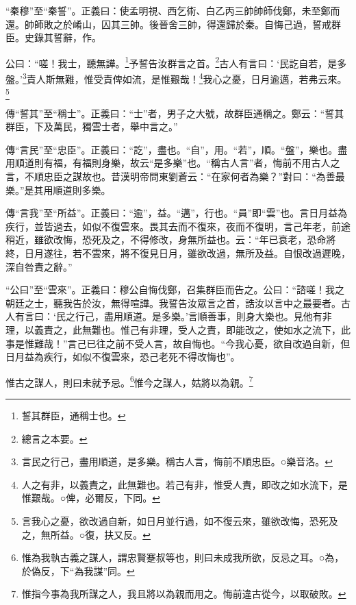 {\noindent\shu{}\fzkt “秦穆”至“秦誓”。正義曰：使孟明視、西乞術、白乙丙三帥帥師伐鄭，未至鄭而還。帥師敗之於崤山，囚其三帥。後晉舍三帥，得還歸於秦。自悔己過，誓戒群臣。史錄其誓辭，作。 \par}

公曰：“嗟！我士，聽無譁。\footnote{誓其群臣，通稱士也。}予誓告汝群言之首。\footnote{總言之本要。}古人有言曰：‘民訖自若，是多盤。’\footnote{言民之行己，盡用順道，是多樂。稱古人言，悔前不順忠臣。○樂音洛。}責人斯無難，惟受責俾如流，是惟艱哉！\footnote{人之有非，以義責之，此無難也。若己有非，惟受人責，即改之如水流下，是惟艱哉。○俾，必爾反，下同。}我心之憂，日月逾邁，若弗云來。\footnote{言我心之憂，欲改過自新，如日月並行過，如不復云來，雖欲改悔，恐死及之，無所益。○復，扶又反。}


{\noindent\zhuan{}\fzbyks 傳“誓其”至“稱士”。正義曰：“士”者，男子之大號，故群臣通稱之。鄭云：“誓其群臣，下及萬民，獨雲士者，舉中言之。” \par}

{\noindent\zhuan{}\fzbyks 傳“言民”至“忠臣”。正義曰：“訖”，盡也。“自”，用。“若”，順。“盤”，樂也。盡用順道則有福，有福則身樂，故云“是多樂”也。“稱古人言”者，悔前不用古人之言，不順忠臣之謀故也。昔漢明帝問東劉蒼云：“在家何者為樂？”對曰：“為善最樂。”是其用順道則多樂。 \par}

{\noindent\zhuan{}\fzbyks 傳“言我”至“所益”。正義曰：“逾”，益。“邁”，行也。“員”即“雲”也。言日月益為疾行，並皆過去，如似不復雲來。畏其去而不復來，夜而不復明，言己年老，前途稍近，雖欲改悔，恐死及之，不得修改，身無所益也。云：“年已衰老，恐命將終，日月遂往，若不雲來，將不復見日月，雖欲改過，無所及益。自恨改過遲晚，深自咎責之辭。” \par}

{\noindent\shu{}\fzkt “公曰”至“雲來”。正義曰：穆公自悔伐鄭，召集群臣而告之。公曰：“諮嗟！我之朝廷之士，聽我告於汝，無得喧譁。我誓告汝眾言之首，誥汝以言中之最要者。古人有言曰：‘民之行己，盡用順道。是多樂。’言順善事，則身大樂也。見他有非理，以義責之，此無難也。惟己有非理，受人之責，即能改之，使如水之流下，此事是惟難哉！”言己已往之前不受人言，故自悔也。“今我心憂，欲自改過自新，但日月益為疾行，如似不復雲來，恐己老死不得改悔也”。 \par}

惟古之謀人，則曰未就予忌。\footnote{惟為我執古義之謀人，謂忠賢蹇叔等也，則曰未成我所欲，反忌之耳。○為，於偽反，下“為我謀”同。}惟今之謀人，姑將以為親。\footnote{惟指今事為我所謀之人，我且將以為親而用之。悔前違古從今，以取破敗。}

